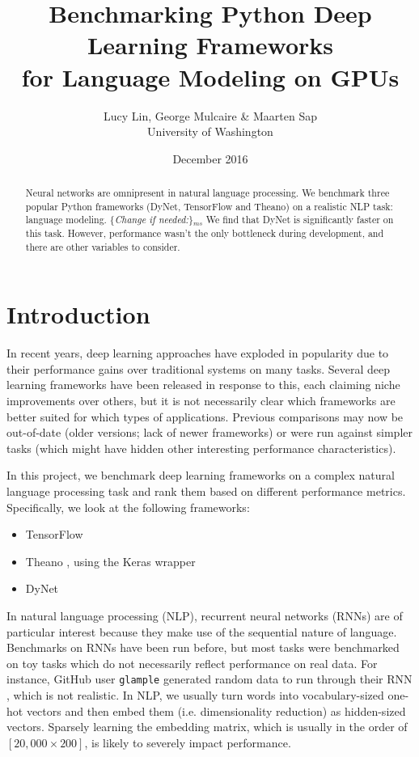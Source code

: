 \documentclass{article}
\title{Benchmarking Python Deep Learning Frameworks\\ for Language Modeling on GPUs}
\author{Lucy Lin, George Mulcaire \& Maarten Sap
\\University of Washington}
\date{December 2016}
\newcommand{\ms}[1]{{\color{cyan}\{\textit{#1}\}$_{ms}$}}
\begin{document}
\maketitle

\begin{abstract}
Neural networks are omnipresent in natural language processing. 
We benchmark three popular Python frameworks (DyNet, TensorFlow and Theano) on a realistic NLP task: language modeling.
\ms{Change if needed:} We find that DyNet is significantly faster on this task. However, performance wasn't the only bottleneck during development, and there are other variables to consider.
\end{abstract}


\section{Introduction}
In recent years, deep learning approaches have exploded in popularity due to their performance gains over traditional systems on many tasks. Several deep learning frameworks have been released in response to this, each claiming niche improvements over others, but it is not necessarily clear which frameworks are better suited for which types of applications. Previous comparisons may now be out-of-date (older versions; lack of newer frameworks) or were run against simpler tasks (which might have hidden other interesting performance characteristics).

In this project, we benchmark deep learning frameworks on a complex natural language processing task and rank them based on different performance metrics. Specifically, we look at the following frameworks:
\begin{itemize}
	\item TensorFlow \cite{tensorflow}
	\item Theano \cite{theano}, using the Keras wrapper \cite{keras}
	\item DyNet \cite{dynet}
\end{itemize}
In natural language processing (NLP), recurrent neural networks (RNNs) are of particular interest because they make use of the sequential nature of language. Benchmarks on RNNs have been run before, but most tasks were benchmarked on toy tasks which do not necessarily reflect performance on real data. For instance, GitHub user \verb!glample! generated random data to run through their RNN \cite{glample}, which is not realistic. In NLP, we usually turn words into vocabulary-sized one-hot vectors and then embed them (i.e. dimensionality reduction) as hidden-sized vectors. Sparsely learning the embedding matrix, which is usually in the order of $[20,000 \times 200]$, is likely to severely impact performance.
\end{document}
